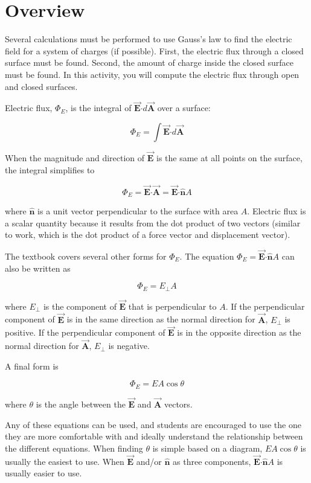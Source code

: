 \documentclass{article}
\newcommand{\bfvec}[1]{\vec{\mathbf{#1}}}
\newcommand{\bfcdot}[0]{\boldsymbol{\cdot}}
\begin{document}
\section{Overview}

Several calculations must be performed to use Gauss's law to find the electric field for a system of charges (if possible). First, the electric flux through a closed surface must be found. Second, the amount of charge inside the closed surface must be found. In this activity, you will compute the electric flux through open and closed surfaces.

Electric flux, $\Phi_E$, is the integral of $\bfvec{E}\bfcdot d\bfvec{A}$ over a surface:

$$
\Phi_E=\int\bfvec{E}\bfcdot d\bfvec{A}
$$

When the magnitude and direction of $\bfvec{E}$ is the same at all points on the surface, the integral simplifies to 

$$
\Phi_E = \bfvec{E}\bfcdot \bfvec{A}=\bfvec{E}\bfcdot \hat{\mathbf{n}}A
$$

where $\hat{\mathbf{n}}$ is a unit vector perpendicular to the surface with area $A$. Electric flux is a scalar quantity because it results from the dot product of two vectors (similar to work, which is the dot product of a force vector and displacement vector).

The textbook covers several other forms for $\Phi_E$. The equation $\Phi_E = \bfvec{E}\bfcdot \hat{\mathbf{n}}A$ can also be written as

$$
\Phi_E = E_{\perp}A
$$

where $E_{\perp}$ is the component of $\bfvec{E}$ that is perpendicular to $A$. If the perpendicular component of $\bfvec{E}$ is in the same direction as the normal direction for $\bfvec{A}$, $E_{\perp}$ is positive. If the perpendicular component of $\bfvec{E}$ is in the opposite direction as the normal direction for $\bfvec{A}$, $E_{\perp}$ is negative.

A final form is

$$
\Phi_E = EA\cos\theta
$$

where $\theta$ is the angle between the $\bfvec{E}$ and $\bfvec{A}$ vectors.

Any of these equations can be used, and students are encouraged to use the one they are more comfortable with and ideally understand the relationship between the different equations. When finding $\theta$ is simple based on a diagram, $EA\cos\theta$ is usually the easiest to use. When $\bfvec{E}$ and/or $\hat{\mathbf{n}}$ as three components, $\bfvec{E}\bfcdot \hat{\mathbf{n}}A$ is usually easier to use.
\end{document}
